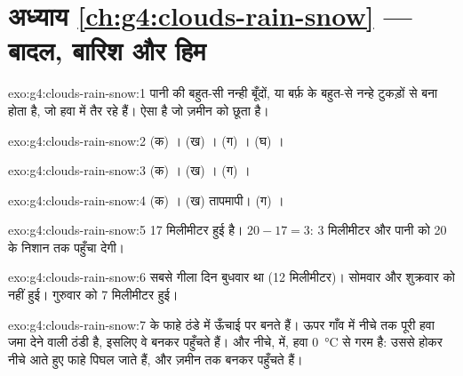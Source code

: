 \section*{अध्याय \ref{ch:g4:clouds-rain-snow} --- बादल, बारिश और हिम}

\begin{solution}{exo:g4:clouds-rain-snow:1}
 पानी की बहुत-सी नन्ही बूँदों, या बर्फ़ के बहुत-से नन्हे टुकड़ों से बना होता
है, जो हवा में तैर रहे हैं।  ऐसा  है जो ज़मीन को छूता है।
\end{solution}

\begin{solution}{exo:g4:clouds-rain-snow:2}
(क) । (ख) । (ग) । (घ) ।
\end{solution}

\begin{solution}{exo:g4:clouds-rain-snow:3}
(क) । (ख) । (ग) ।
\end{solution}

\begin{solution}{exo:g4:clouds-rain-snow:4}
(क) । (ख) तापमापी। (ग) ।
\end{solution}

\begin{solution}{exo:g4:clouds-rain-snow:5}
17 मिलीमीटर  हुई है। $20 - 17 = 3$: 3 मिलीमीटर और  पानी को 20 के
निशान तक पहुँचा देगी।
\end{solution}

\begin{solution}{exo:g4:clouds-rain-snow:6}
सबसे गीला दिन बुधवार था (12 मिलीमीटर)। सोमवार और शुक्रवार को  नहीं हुई।
गुरुवार को 7 मिलीमीटर  हुई।
\end{solution}

\begin{solution}{exo:g4:clouds-rain-snow:7}
 के फाहे ठंडे  में ऊँचाई पर बनते हैं। ऊपर  गाँव में नीचे तक पूरी
हवा जमा देने वाली ठंडी है, इसलिए वे  बनकर पहुँचते हैं। और नीचे,  में,
हवा \SI{0}{\celsius} से गरम है: उससे होकर नीचे आते हुए फाहे पिघल जाते हैं, और
ज़मीन तक  बनकर पहुँचते हैं।
\end{solution}

